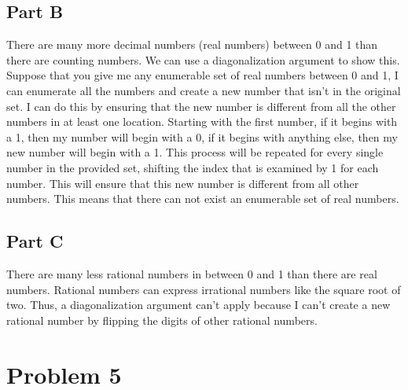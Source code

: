 \documentclass[12pt]{article}
\begin{document}
\subsection*{Part B}

There are many more decimal numbers (real numbers) between 0 and 1 than there are counting numbers. We can use a diagonalization argument to show this. Suppose that you give me any enumerable set of real numbers between 0 and 1, I can enumerate all the numbers and create a new number that isn't in the original set. I can do this by ensuring that the new number is different from all the other numbers in at least one location. Starting with the first number, if it begins with a 1, then my number will begin with a 0, if it begins with anything else, then my new number will begin with a 1. This process will be repeated for every single number in the provided set, shifting the index that is examined by 1 for each number. This will ensure that this new number is different from all other numbers. This means that there can not exist an enumerable set of real numbers. 

\subsection*{Part C}

There are many less rational numbers in between 0 and 1 than there are real numbers. Rational numbers can express irrational numbers like the square root of two. Thus, a diagonalization argument can't apply because I can't create a new rational number by flipping the digits of other rational numbers. 


\section*{Problem 5}
\end{document}

